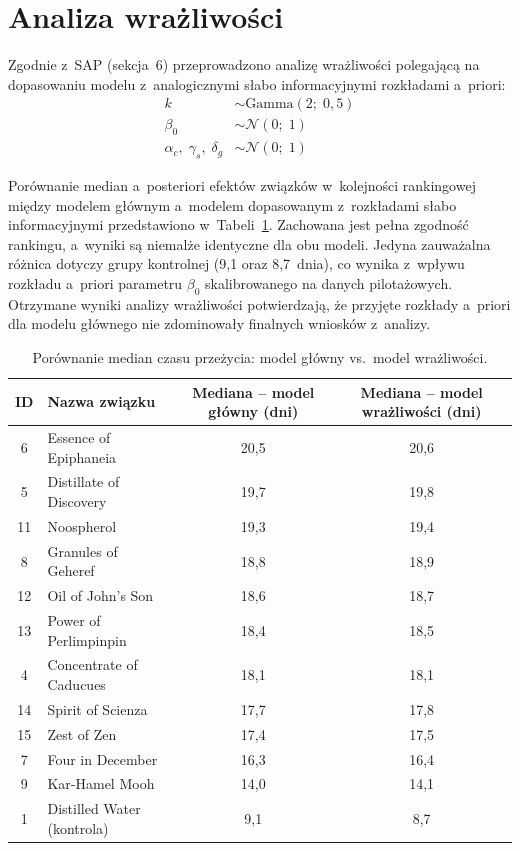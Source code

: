 \documentclass[12pt, a4paper]{article}
\begin{document}
\section{Analiza wrażliwości}

Zgodnie z~SAP (sekcja~6) przeprowadzono analizę wrażliwości polegającą na dopasowaniu modelu z~analogicznymi słabo informacyjnymi rozkładami a~priori:
\begin{align}
    k &\sim \mathrm{Gamma}(2;\;0{,}5) \\
    \beta_0 &\sim \mathcal{N}(0;\;1) \\
    \alpha_c,\;\gamma_s,\;\delta_g &\sim \mathcal{N}(0;\;1)
\end{align}

Porównanie median a~posteriori efektów związków w~kolejności rankingowej 
między modelem głównym a~modelem dopasowanym z~rozkładami słabo 
informacyjnymi przedstawiono w~Tabeli~\ref{tab:sensitivity}. Zachowana 
jest pełna zgodność rankingu, a~wyniki są niemalże identyczne dla obu 
modeli. Jedyna zauważalna różnica dotyczy grupy kontrolnej (9,1 oraz 
8,7~dnia), co wynika z~wpływu rozkładu a~priori parametru $\beta_0$ 
skalibrowanego na danych pilotażowych. Otrzymane wyniki analizy 
wrażliwości potwierdzają, że przyjęte rozkłady a~priori dla modelu 
głównego nie zdominowały finalnych wniosków z~analizy.

\begin{table}[h!]
\centering
\footnotesize
\caption{Porównanie median czasu przeżycia: model główny vs.~model wrażliwości.}
\label{tab:sensitivity}
\begin{tabular}{clcc}
\toprule
\textbf{ID} & \textbf{Nazwa związku} & \textbf{Mediana -- model główny (dni)} & \textbf{Mediana -- model wrażliwości (dni)} \\
\midrule
 6 & Essence of Epiphaneia     & 20,5 & 20,6 \\
 5 & Distillate of Discovery   & 19,7 & 19,8 \\
11 & Noospherol                & 19,3 & 19,4 \\
 8 & Granules of Geheref       & 18,8 & 18,9 \\
12 & Oil of John's Son         & 18,6 & 18,7 \\
13 & Power of Perlimpinpin     & 18,4 & 18,5 \\
 4 & Concentrate of Caducues   & 18,1 & 18,1 \\
14 & Spirit of Scienza         & 17,7 & 17,8 \\
15 & Zest of Zen               & 17,4 & 17,5 \\
 7 & Four in December          & 16,3 & 16,4 \\
 9 & Kar-Hamel Mooh            & 14,0 & 14,1 \\
 1 & Distilled Water (kontrola) & 9,1 & 8,7 \\
\bottomrule
\end{tabular}
\end{table}
\end{document}
